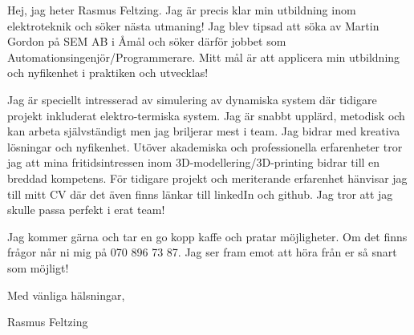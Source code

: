 \documentclass{article}
\begin{document}
Hej, jag heter Rasmus Feltzing. Jag är precis klar min utbildning inom elektroteknik och söker nästa utmaning! Jag blev tipsad att söka av Martin Gordon på SEM AB i Åmål och söker därför jobbet som Automationsingenjör/Programmerare. Mitt mål är att applicera min utbildning och nyfikenhet i praktiken och utvecklas! 


Jag är speciellt intresserad av simulering av dynamiska system där tidigare projekt inkluderat elektro-termiska system. Jag är snabbt upplärd, metodisk och kan arbeta självständigt men jag briljerar mest i team. Jag bidrar med kreativa lösningar och nyfikenhet. Utöver akademiska och professionella erfarenheter tror jag att mina fritidsintressen inom 3D-modellering/3D-printing bidrar till en breddad kompetens. För tidigare projekt och meriterande erfarenhet hänvisar jag till mitt CV där det även finns länkar till linkedIn och github. Jag tror att jag skulle passa perfekt i erat team!


Jag kommer gärna och tar en go kopp kaffe och pratar möjligheter. Om det finns frågor når ni mig på 070 896 73 87. Jag ser fram emot att höra från er så snart som möjligt! 

\bigskip %

Med vänliga hälsningar,

\vspace{50pt} %

Rasmus Feltzing
\end{document}
